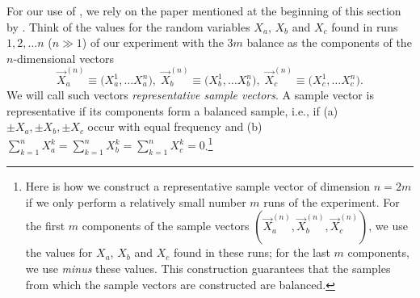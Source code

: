 For our use of \citet{Fisher 1915, Fisher 1924}, we rely on the paper mentioned at the beginning of this section by \citet[sec.\ 10, pp.\ 72--74; see also Kendall, 1961, pp.\ 55--57]{Aldrich 1998}. Think of the values for the random variables $X_a$, $X_b$ and $X_c$ found in runs $1, 2, \ldots n$ ($n \gg 1$) of our experiment with the 3$m$ balance as the components of the $n$-dimensional vectors
\begin{equation}
\vec{X}^{(n)}_a \equiv \big( X_a^1, \dots X_a^n \big), \; \vec{X}^{(n)}_b \equiv \big( X_b^1, \dots X_b^n \big), \; 
\vec{X}^{(n)}_c \equiv \big( X_c^1, \dots X_c^n \big).
\label{sample vectors}
\end{equation}
We will call such vectors \emph{representative sample vectors}. A sample vector is representative if its components form a balanced sample, i.e., if (a) $\pm X_a, \pm X_b, \pm X_c$ occur with equal frequency and (b) $\sum_{k=1}^n X_a^k = \sum_{k=1}^n X_b^k = \sum_{k=1}^n X_c^k = 0$.\footnote{Here is how we construct a representative sample vector of dimension $n = 2m$ if we only perform a relatively small number $m$ runs of the experiment. For the first $m$ components of the sample vectors $(\vec{X}^{(n)}_a, \vec{X}^{(n)}_b, \vec{X}^{(n)}_c)$, we use the values for $X_a$, $X_b$ and $X_c$ found in these runs; for the last $m$ components, we use \emph{minus} these values. This construction guarantees that the samples from which the sample vectors are constructed are balanced.}

